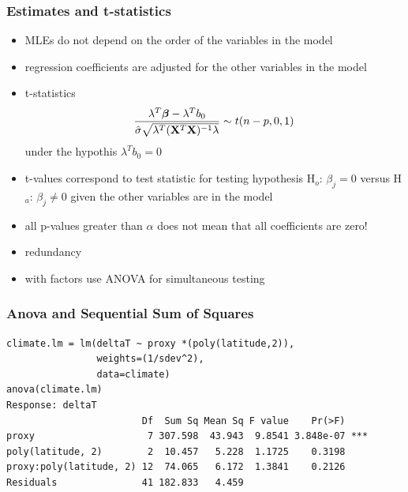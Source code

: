 \documentclass[handout]{beamer}
\begin{document}
\begin{frame}
  \frametitle{Estimates and t-statistics}
  \begin{itemize}
  \item MLEs do not depend on the order of the variables in the model \pause
  \item regression coefficients are adjusted for the other variables
    in the model \pause
\item t-statistics  $$\frac{\lambda^T\boldsymbol{\beta} - \lambda^Tb_0} 
{ \hat{\sigma} \sqrt{\lambda^T (\mathbf{X}^T\mathbf{X})^{-1} \lambda}} \sim t(n - p, 0,
1)$$
under the hypothis $\lambda^Tb_0 = 0$
  \item t-values  correspond to test statistic for testing hypothesis
    H$_o$: $\beta_j = 0$ versus H$_a$: $\beta_j \neq 0$ given  the
    other variables are in the model \pause
  \item all p-values greater than $\alpha$ does not mean that all
    coefficients are zero! \pause
 \item redundancy \pause
 \item with factors use ANOVA for simultaneous testing \pause
  \end{itemize}
\end{frame}

\begin{frame}[fragile]
  \frametitle{Anova and Sequential Sum of Squares }
  \begin{small}
\begin{verbatim}
climate.lm = lm(deltaT ~ proxy *(poly(latitude,2)),
                weights=(1/sdev^2), 
                data=climate)
anova(climate.lm)
Response: deltaT
                        Df  Sum Sq Mean Sq F value    Pr(>F)    
proxy                    7 307.598  43.943  9.8541 3.848e-07 ***
poly(latitude, 2)        2  10.457   5.228  1.1725    0.3198    
proxy:poly(latitude, 2) 12  74.065   6.172  1.3841    0.2126    
Residuals               41 182.833   4.459  
\end{verbatim}
    
\end{small}

\end{frame}
\end{document}
